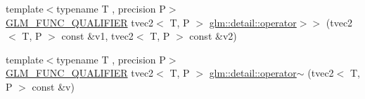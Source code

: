 \begin{DoxyCompactItemize}
\item 
{\footnotesize template$<$typename T , precision P$>$ }\\\hyperlink{setup_8hpp_a33fdea6f91c5f834105f7415e2a64407}{G\+L\+M\+\_\+\+F\+U\+N\+C\+\_\+\+Q\+U\+A\+L\+I\+F\+I\+ER} tvec2$<$ T, P $>$ \hyperlink{namespaceglm_1_1detail_a04b8750e1aa326acee590ae02e5f3a05}{glm\+::detail\+::operator$>$$>$} (tvec2$<$ T, P $>$ const \&v1, tvec2$<$ T, P $>$ const \&v2)
\item 
{\footnotesize template$<$typename T , precision P$>$ }\\\hyperlink{setup_8hpp_a33fdea6f91c5f834105f7415e2a64407}{G\+L\+M\+\_\+\+F\+U\+N\+C\+\_\+\+Q\+U\+A\+L\+I\+F\+I\+ER} tvec2$<$ T, P $>$ \hyperlink{namespaceglm_1_1detail_a2a58111c7c7b5b6a4bd8bc60b081348f}{glm\+::detail\+::operator$\sim$} (tvec2$<$ T, P $>$ const \&v)
\end{DoxyCompactItemize}
